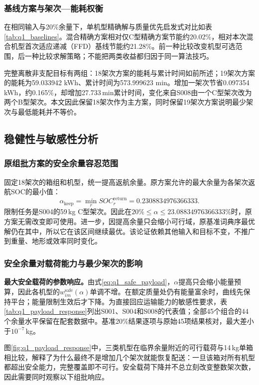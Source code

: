 \subsubsection{基线方案与架次—能耗权衡}
在相同输入与20\%余量下，单机型精确解与质量优先启发式对比如表\ref{tab:q1_baselines}。混合精确方案相对仅C型精确方案节能约20.02\%，相对本次混合机型首次适应递减（FFD）基线节能约21.28\%。前一种比较改变机型可选范围，后一种比较求解策略；不能把两类收益都归因于同一算法技巧。


完整离散非支配目标有两组：18架次方案的能耗与累计时间如前所述；19架次方案的能耗为59.033942 kWh、累计时间为573.999623 min。增加一架次节省0.097354\,kWh，约0.165\%，却增加27.733\,min累计时间，变化来自S008由一个C型架次改为两个B型架次。本文因此保留18架次作为主方案，同时保留19架次方案说明最少架次与最低能耗并不等价。



\subsection{稳健性与敏感性分析}
\label{sec:q1_robust}
\subsubsection{原组批方案的安全余量容忍范围}
固定18架次的箱组和机型，统一提高返航余量。原方案允许的最大余量为各架次返航SOC的最小值：
\begin{equation}
 \alpha_{\mathrm{keep}}=\min_r SOC_r^{\mathrm{return}}=0.2308834976366333.
\label{eq:q1_keep}
\end{equation}
限制任务是S004的59\,kg C型架次。因此在$20\%\le\alpha\le23.08834976366333\%$时，原方案无需改变即可使用。进一步，因提高余量只会缩小可行域，原基准词典序最优解仍在其中，所以它在该区间继续最优。该论证依赖其他输入和目标不变，不推广到重量、地形或效率同时变化。

\subsubsection{安全余量对载荷能力与最少架次的影响}
\textbf{最大安全载荷的参数响应。}由式\eqref{eq:q1_safe_payload}，$\alpha$提高只会缩小能量预算，因此各机型的$w_{im}^{\mathrm{safe}}(\alpha)$单调不增。在额定质量处仍有能量富余时，曲线先保持平台；能量限制生效后才下降。为直接回应运输能力的敏感性要求，表\ref{tab:q1_payload_response}列出S001、S004和S008的代表值；全部45个组合的44个余量水平保留在配套数据中。基准20\%结果逐项与原始45项结果核对，最大差小于$10^{-7}$\,kg。

图\ref{fig:q1_payload_response}中，三类机型在临界余量附近的可行载荷与14\,kg单箱相比较，解释了为什么最终不是增加几个架次就能恢复配送：一旦该箱对所有机型都超出安全能力，完整覆盖即不可行。安全载荷下降并不总立刻改变整数架次数，因此需要同时观察以下组批响应。

